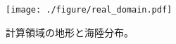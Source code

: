\begin{figure}[tb]
\begin{center}
  \texttt{[image: ./figure/real\_domain.pdf]}\\
  \caption{計算領域の地形と海陸分布。}
  \label{fig:tutrial_real_domain}
\end{center}
\end{figure}
